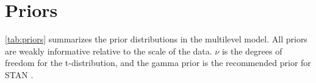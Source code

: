 \documentclass[12pt]{article}
\begin{document}



\section{Priors}

\autoref{tab:priors} summarizes the prior distributions in the multilevel model. 
All priors are weakly informative relative to the scale of the data. 
$\nu$ is the degrees of freedom for the t-distribution, and the gamma prior is the recommended prior for STAN \citep{JuarezSteele2010}. 
\end{document}
